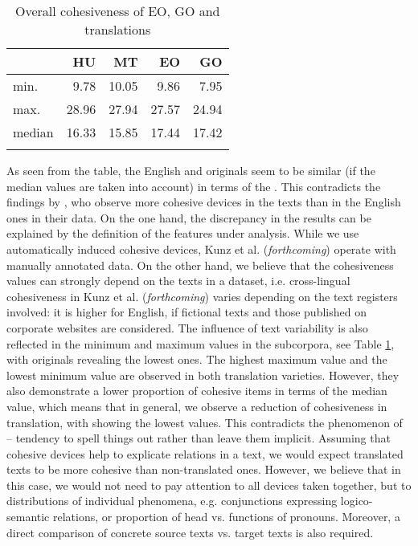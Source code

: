 \documentclass[output=paper]{langsci/langscibook.cls}
\begin{document}
\begin{table}

\begin{tabular}{lrrrr}
\lsptoprule
	&	\bf HU &\bf MT &\bf EO &\bf GO\\
\midrule
min.    &       9.78  & 10.05 & 9.86  & 7.95 \\
max.    &       28.96 & 27.94 & 27.57 & 24.94 \\
median	&	16.33&	15.85 & 17.44 &	17.42\\
\lspbottomrule
\end{tabular}
\caption{Overall cohesiveness of EO, GO and translations}
\label{table:cohesiveness}
\end{table}

As seen from the table, the English and  originals seem to be similar (if the median values are taken into account) in terms of the . This contradicts the findings by \citep[22]{SleGeccoForthcoming}, who observe more cohesive devices in the  texts than in the English ones in their data. 
On the one hand, the discrepancy in the results can be explained by the definition of the features under analysis. While we use automatically induced cohesive devices, Kunz et al. (\textsl{forthcoming}) operate with manually annotated data. On the other hand, we believe that the cohesiveness values can strongly depend on the texts in a dataset, i.e. cross-lingual cohesiveness in Kunz et al. (\textsl{forthcoming}) varies depending on the text registers involved: it is higher for English, if fictional texts and those published on corporate websites are considered. %
The influence of text variability is also reflected in the minimum and maximum values in the subcorpora, see Table \ref{table:cohesiveness}, with  originals revealing the lowest ones. The highest maximum value and the lowest minimum value are observed in both translation varieties. However, they also demonstrate a lower proportion of cohesive items in terms of the median value, which means that in general, we observe a reduction of cohesiveness in translation, with  showing the lowest values. %
This contradicts the phenomenon of  -- tendency to spell things out rather than leave them implicit. Assuming that cohesive devices help to explicate  relations in a text, we would expect translated texts to be more cohesive than non-translated ones. However, we believe that in this case, we would not need to pay attention to all devices taken together, but to distributions of individual phenomena, e.g. conjunctions expressing logico-semantic relations, or proportion of head vs.  functions of pronouns. Moreover, a direct comparison of concrete source texts vs. target texts is also required.
\end{document}
